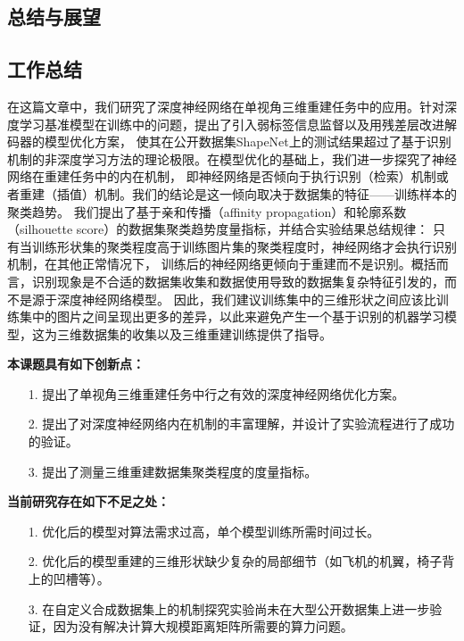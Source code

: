 \documentclass[bachelor, nocolorlinks, printoneside]{seuthesis} %
\begin{document}
\begin{Main}
\chapter{总结与展望}

\section{工作总结}
在这篇文章中，我们研究了深度神经网络在单视角三维重建任务中的应用。针对深度学习基准模型在训练中的问题，提出了引入弱标签信息监督以及用残差层改进解码器的模型优化方案，
使其在公开数据集ShapeNet上的测试结果超过了基于识别机制的非深度学习方法的理论极限。在模型优化的基础上，我们进一步探究了神经网络在重建任务中的内在机制，
即神经网络是否倾向于执行识别（检索）机制或者重建（插值）机制。我们的结论是这一倾向取决于数据集的特征——训练样本的聚类趋势。
我们提出了基于亲和传播（affinity propagation）和轮廓系数（silhouette score）的数据集聚类趋势度量指标，并结合实验结果总结规律：
只有当训练形状集的聚类程度高于训练图片集的聚类程度时，神经网络才会执行识别机制，在其他正常情况下，
训练后的神经网络更倾向于重建而不是识别。概括而言，识别现象是不合适的数据集收集和数据使用导致的数据集复杂特征引发的，而不是源于深度神经网络模型。
因此，我们建议训练集中的三维形状之间应该比训练集中的图片之间呈现出更多的差异，以此来避免产生一个基于识别的机器学习模型，这为三维数据集的收集以及三维重建训练提供了指导。

\noindent
\textbf{本课题具有如下创新点：}
\begin{itemize}
    \item[1.] 提出了单视角三维重建任务中行之有效的深度神经网络优化方案。
    \item[2.] 提出了对深度神经网络内在机制的丰富理解，并设计了实验流程进行了成功的验证。
    \item[3.] 提出了测量三维重建数据集聚类程度的度量指标。
\end{itemize}

\noindent
\textbf{当前研究存在如下不足之处：}
\begin{itemize}
    \item[1.] 优化后的模型对算法需求过高，单个模型训练所需时间过长。
    \item[2.] 优化后的模型重建的三维形状缺少复杂的局部细节（如飞机的机翼，椅子背上的凹槽等）。
    \item[3.] 在自定义合成数据集上的机制探究实验尚未在大型公开数据集上进一步验证，因为没有解决计算大规模距离矩阵所需要的算力问题。
\end{itemize}


\end{Main}
\end{document}
